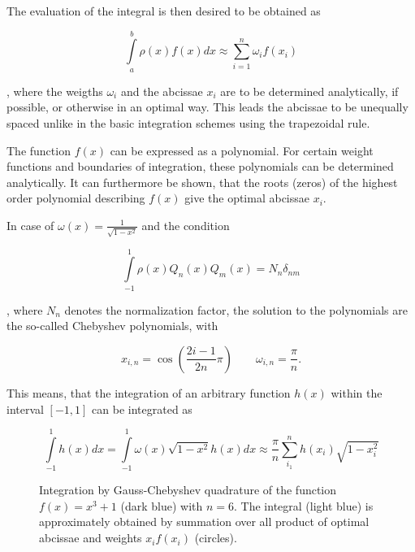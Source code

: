 The evaluation of the integral is then desired to be obtained as

\begin{equation}
  \int\limits_a^b \rho(x) f(x) dx \approx \sum\limits_{i=1}^n \omega_i f(x_i)
\end{equation}

, where the weigths $\omega_i$ and the abcissae $x_i$ are to be determined
analytically, if possible, or otherwise in an optimal way. This leads the abcissae
to be unequally spaced unlike in the basic
integration schemes using the trapezoidal rule.

The function $f(x)$ can be expressed as a polynomial.
For certain weight functions and boundaries
of integration, these
polynomials can be determined analytically.
It can furthermore be shown, that the roots (zeros) of the highest order polynomial
describing $f(x)$ give the optimal abcissae $x_i$.

In case of
$\omega(x)= \frac{1}{\sqrt{1-x^2}}$ and the condition

\begin{equation}
  \int\limits_{-1}^{1} \rho(x) Q_n(x) Q_m(x) = N_n \delta_{nm}
\end{equation}

, where $N_n$ denotes the normalization factor,
the solution to the polynomials are the so-called Chebyshev polynomials, with

\begin{equation}
  x_{i,n} = \cos \left( \frac{2i-1}{2n} \pi \right)
  \quad\quad \omega_{i,n} = \frac \pi n .
\end{equation}

This means, that the integration of an arbitrary function $h(x)$ within
the interval $[-1,1]$ can be integrated as

\begin{equation}
  \int\limits_{-1}^1 h(x) dx = \int\limits_{-1}^1 \omega(x) \sqrt{1-x^2} h(x) dx
  \approx \frac \pi n \sum\limits_{i_1}^n h(x_i) \sqrt{1-x_i^2}

\end{equation}

\begin{figure}[h]
  \centering
  
  \caption{Integration by Gauss-Chebyshev quadrature of the function
           $f(x)=x^3 + 1$ (dark blue) with $n=6$. The integral (light blue)
           is approximately obtained by summation
           over all product of optimal abcissae and weights $x_if(x_i)$ (circles).}
  \label{figure:gaussian_quadrature}
\end{figure}

